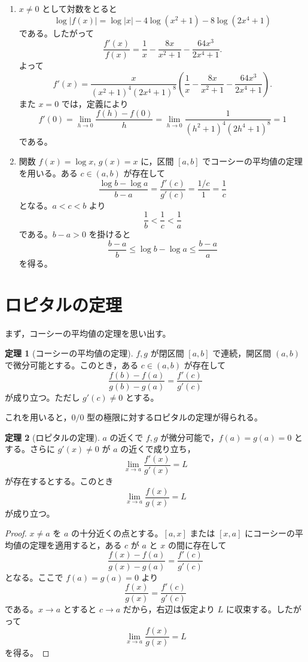 \documentclass[a4paper,12pt]{jsarticle}
\theoremstyle{definition}
\newtheorem*{theorem}{定理}
\begin{document}
\begin{enumerate}
\item $x\neq 0$ として対数をとると
\[
\log |f(x)|=\log |x|-4\log(x^2+1)-8\log(2x^4+1)
\]
である。したがって
\[
\frac{f'(x)}{f(x)}
=\frac{1}{x}-\frac{8x}{x^2+1}-\frac{64x^3}{2x^4+1}.
\]
よって
\[
f'(x)=
\frac{x}{(x^2+1)^4(2x^4+1)^8}
\left(
\frac{1}{x}-\frac{8x}{x^2+1}-\frac{64x^3}{2x^4+1}
\right).
\]
また $x=0$ では，定義により
\[
f'(0)=\lim_{h\to 0}\frac{f(h)-f(0)}{h}
=\lim_{h\to 0}\frac{1}{(h^2+1)^4(2h^4+1)^8}
=1
\]
である。

\item 関数 $f(x)=\log x$, $g(x)=x$ に，区間 $[a,b]$ でコーシーの平均値の定理を用いる。ある $c\in(a,b)$ が存在して
\[
\frac{\log b-\log a}{b-a}
=\frac{f'(c)}{g'(c)}
=\frac{1/c}{1}
=\frac{1}{c}
\]
となる。$a<c<b$ より
\[
\frac{1}{b}<\frac{1}{c}<\frac{1}{a}
\]
である。$b-a>0$ を掛けると
\[
\frac{b-a}{b}\leq \log b-\log a\leq \frac{b-a}{a}
\]
を得る。
\end{enumerate}

\section{ロピタルの定理}

まず，コーシーの平均値の定理を思い出す。

\begin{theorem}[コーシーの平均値の定理]
$f,g$ が閉区間 $[a,b]$ で連続，開区間 $(a,b)$ で微分可能とする。このとき，ある $c\in(a,b)$ が存在して
\[
\frac{f(b)-f(a)}{g(b)-g(a)}=\frac{f'(c)}{g'(c)}
\]
が成り立つ。ただし $g'(c)\neq 0$ とする。
\end{theorem}

これを用いると，$0/0$ 型の極限に対するロピタルの定理が得られる。

\begin{theorem}[ロピタルの定理]
$a$ の近くで $f,g$ が微分可能で，$f(a)=g(a)=0$ とする。さらに $g'(x)\neq 0$ が $a$ の近くで成り立ち，
\[
\lim_{x\to a}\frac{f'(x)}{g'(x)}=L
\]
が存在するとする。このとき
\[
\lim_{x\to a}\frac{f(x)}{g(x)}=L
\]
が成り立つ。
\end{theorem}

\begin{proof}
$x\neq a$ を $a$ の十分近くの点とする。$[a,x]$ または $[x,a]$ にコーシーの平均値の定理を適用すると，ある $c$ が $a$ と $x$ の間に存在して
\[
\frac{f(x)-f(a)}{g(x)-g(a)}=\frac{f'(c)}{g'(c)}
\]
となる。ここで $f(a)=g(a)=0$ より
\[
\frac{f(x)}{g(x)}=\frac{f'(c)}{g'(c)}
\]
である。$x\to a$ とすると $c\to a$ だから，右辺は仮定より $L$ に収束する。したがって
\[
\lim_{x\to a}\frac{f(x)}{g(x)}=L
\]
を得る。
\end{proof}
\end{document}
